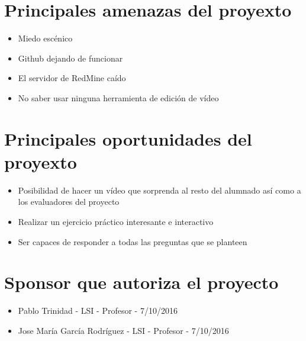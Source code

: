 \documentclass[a4paper,10pt]{scrartcl}
\begin{document}
\section{Principales amenazas del proyexto}
\begin{itemize}
	\item Miedo escénico
	\item Github dejando de funcionar
	\item El servidor de RedMine caído
	\item No saber usar ninguna herramienta de edición de vídeo
\end{itemize}

\section{Principales oportunidades del proyexto}
\begin{itemize}
	\item Posibilidad de hacer un vídeo que sorprenda al resto del alumnado así como a los evaluadores del proyecto
	\item Realizar un ejercicio práctico interesante e interactivo
	\item Ser capaces de responder a todas las preguntas que se planteen
\end{itemize}

\section{Sponsor que autoriza el proyecto}
\begin{itemize}
	\item Pablo Trinidad - LSI - Profesor  - 7/10/2016
	\item Jose María García Rodríguez - LSI - Profesor - 7/10/2016
\end{itemize}

\end{document}
